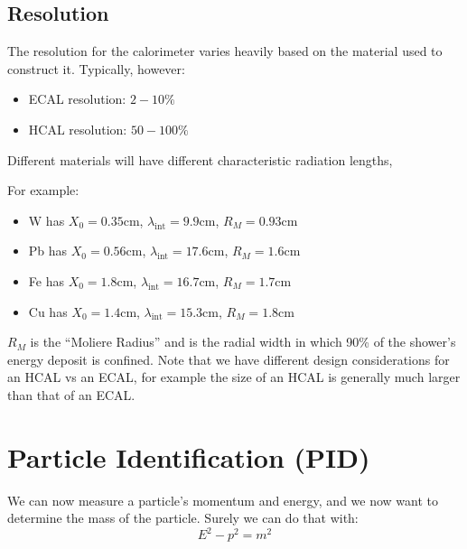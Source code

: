 \subsection{Resolution}
The resolution for the calorimeter varies heavily based on the material used to construct it. Typically, however:
\begin{itemize}
    \item ECAL resolution: $2-10\%$
    \item HCAL resolution: $50-100\%$
\end{itemize}

Different materials will have different characteristic radiation lengths,

For example:
\begin{itemize}
    \item W has $X_0 = 0.35$cm, $\lambda_\text{int} = 9.9$cm, $R_M = 0.93$cm
    \item Pb has $X_0 = 0.56$cm, $\lambda_\text{int} = 17.6$cm, $R_M = 1.6$cm
    \item Fe has $X_0 = 1.8$cm, $\lambda_\text{int} = 16.7$cm, $R_M = 1.7$cm
    \item Cu has $X_0 = 1.4$cm, $\lambda_\text{int} = 15.3$cm, $R_M = 1.8$cm
\end{itemize}

$R_M$ is the ``Moliere Radius'' and is the radial width in which 90\% of the shower's energy deposit is confined. Note that we have different design considerations for an HCAL vs an ECAL, for example the size of an HCAL is generally much larger than that of an ECAL.

\section{Particle Identification (PID)}
We can now measure a particle's momentum and energy, and we now want to determine the mass of the particle. Surely we can do that with:
\[
    E^2 - p^2 = m^2
\]

